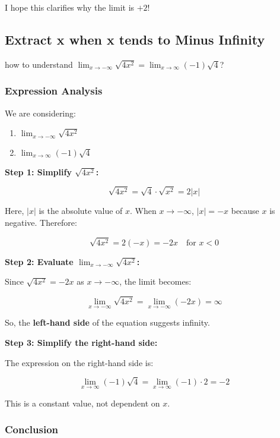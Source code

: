 \documentclass[a4paper,12pt]{book}
\begin{document}
I hope this clarifies why the limit is \textbf{\( +2 \)}!

\subsection{Extract x when x tends to Minus Infinity}

\begin{bluebox}
how to understand \( \lim_{x\to -\infty} \sqrt{4x^2}=\lim_{x\to \infty}(-1)\sqrt{4} \)?
\end{bluebox}

\subsubsection{Expression Analysis}

We are considering:
\begin{enumerate}
\item 
\( \lim_{x \to -\infty} \sqrt{4x^2} \)

\item 
\( \lim_{x \to \infty} (-1)\sqrt{4} \)

\end{enumerate}

\textbf{Step 1: Simplify \( \sqrt{4x^2} \):}

\[
\sqrt{4x^2} = \sqrt{4} \cdot \sqrt{x^2} = 2|x|
\]

Here, \( |x| \) is the absolute value of \( x \). When \( x \to -\infty \), \( |x| = -x \) because \( x \) is negative. Therefore:

\[
\sqrt{4x^2} = 2(-x) = -2x \quad \text{for } x < 0
\]

\textbf{Step 2: Evaluate \( \lim_{x \to -\infty} \sqrt{4x^2} \):}

Since \( \sqrt{4x^2} = -2x \) as \( x \to -\infty \), the limit becomes:

\[
\lim_{x \to -\infty} \sqrt{4x^2} = \lim_{x \to -\infty} (-2x) = \infty
\]

So, the \textbf{left-hand side} of the equation suggests infinity.

\textbf{Step 3: Simplify the right-hand side:}

The expression on the right-hand side is:

\[
\lim_{x \to \infty} (-1)\sqrt{4} = \lim_{x \to \infty} (-1) \cdot 2 = -2
\]

This is a constant value, not dependent on \( x \).

\hrulefill

\subsubsection{Conclusion}
\end{document}
